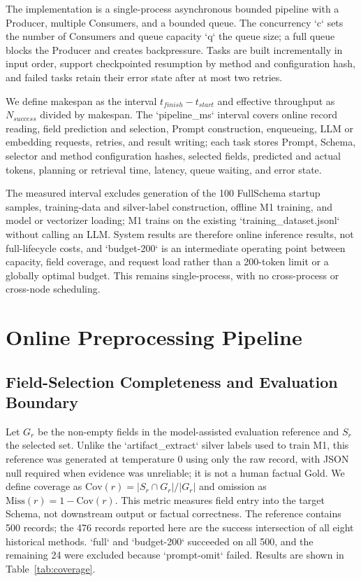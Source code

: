 \documentclass[runningheads]{llncs}
\newcommand{\method}{M1}
\newcommand{\full}{FullSchema}
\begin{document}
The implementation is a single-process asynchronous bounded pipeline with a Producer, multiple Consumers, and a bounded queue. The concurrency `c` sets the number of Consumers and queue capacity `q` the queue size; a full queue blocks the Producer and creates backpressure. Tasks are built incrementally in input order, support checkpointed resumption by method and configuration hash, and failed tasks retain their error state after at most two retries.

We define makespan as the interval $t_{finish}-t_{start}$ and effective throughput as $N_{success}$ divided by makespan. The `pipeline_ms` interval covers online record reading, field prediction and selection, Prompt construction, enqueueing, LLM or embedding requests, retries, and result writing; each task stores Prompt, Schema, selector and method configuration hashes, selected fields, predicted and actual tokens, planning or retrieval time, latency, queue waiting, and error state.

The measured interval excludes generation of the 100 \full{} startup samples, training-data and silver-label construction, offline \method{} training, and model or vectorizer loading; \method{} trains on the existing `training_dataset.jsonl` without calling an LLM. System results are therefore online inference results, not full-lifecycle costs, and `budget-200` is an intermediate operating point between capacity, field coverage, and request load rather than a 200-token limit or a globally optimal budget. This remains single-process, with no cross-process or cross-node scheduling.

\section{Online Preprocessing Pipeline}
\subsection{Field-Selection Completeness and Evaluation Boundary}

Let $G_r$ be the non-empty fields in the model-assisted evaluation reference and $S_r$ the selected set. Unlike the `artifact_extract` silver labels used to train M1, this reference was generated at temperature 0 using only the raw record, with JSON null required when evidence was unreliable; it is not a human factual Gold. We define coverage as $\mathrm{Cov}(r)=|S_r\cap G_r|/|G_r|$ and omission as $\mathrm{Miss}(r)=1-\mathrm{Cov}(r)$. This metric measures field entry into the target Schema, not downstream output or factual correctness. The reference contains 500 records; the 476 records reported here are the success intersection of all eight historical methods. `full` and `budget-200` succeeded on all 500, and the remaining 24 were excluded because `prompt-omit` failed. Results are shown in Table~\ref{tab:coverage}.
\end{document}

